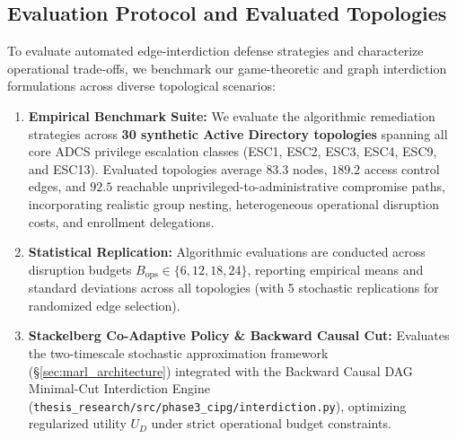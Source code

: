 \subsection{Evaluation Protocol and Evaluated Topologies}
To evaluate automated edge-interdiction defense strategies and characterize operational trade-offs, we benchmark our game-theoretic and graph interdiction formulations across diverse topological scenarios:
\begin{enumerate}
    \item \textbf{Empirical Benchmark Suite:} We evaluate the algorithmic remediation strategies across \textbf{30 synthetic Active Directory topologies} spanning all core ADCS privilege escalation classes (ESC1, ESC2, ESC3, ESC4, ESC9, and ESC13). Evaluated topologies average $83.3$ nodes, $189.2$ access control edges, and $92.5$ reachable unprivileged-to-administrative compromise paths, incorporating realistic group nesting, heterogeneous operational disruption costs, and enrollment delegations.
    \item \textbf{Statistical Replication:} Algorithmic evaluations are conducted across disruption budgets $B_{\text{ops}} \in \{6, 12, 18, 24\}$, reporting empirical means and standard deviations across all topologies (with 5 stochastic replications for randomized edge selection).
    \item \textbf{Stackelberg Co-Adaptive Policy \& Backward Causal Cut:} Evaluates the two-timescale stochastic approximation framework (§\ref{sec:marl_architecture}) integrated with the Backward Causal DAG Minimal-Cut Interdiction Engine (\texttt{thesis\_research/src/phase3\_cipg/interdiction.py}), optimizing regularized utility $U_D$ under strict operational budget constraints.
\end{enumerate}

